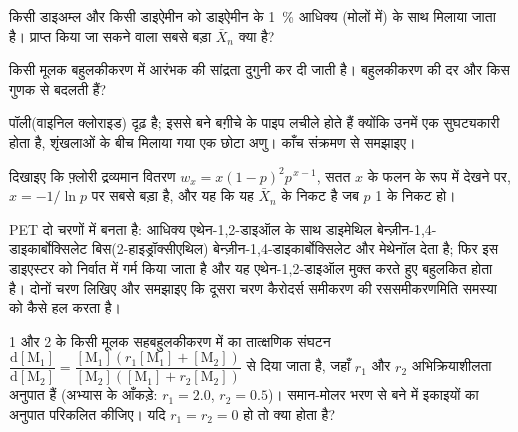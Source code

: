 \begin{exercise}[$\star\star$]\label{exo:b2:polymer-synthesis:7}
किसी डाइअम्ल और किसी डाइऐमीन को डाइऐमीन के 1~\% आधिक्य (मोलों में) के साथ मिलाया जाता है। प्राप्त किया जा सकने वाला
सबसे बड़ा $\bar X_n$ क्या है?
\end{exercise}

\begin{exercise}[$\star\star$]\label{exo:b2:polymer-synthesis:8}
किसी मूलक बहुलकीकरण में आरंभक की सांद्रता दुगुनी कर दी जाती है। बहुलकीकरण की दर और
 किस गुणक से बदलती हैं?
\end{exercise}

\begin{exercise}[$\star\star$]\label{exo:b2:polymer-synthesis:9}
पॉली(वाइनिल क्लोराइड) दृढ़ है; इससे बने बग़ीचे के पाइप लचीले होते हैं क्योंकि उनमें एक सुघट्यकारी होता है,
शृंखलाओं के बीच मिलाया गया एक छोटा अणु। काँच संक्रमण से समझाइए।
\end{exercise}

\begin{exercise}[$\star\star\star$]\label{exo:b2:polymer-synthesis:10}
दिखाइए कि फ़्लोरी द्रव्यमान वितरण $w_x = x(1-p)^2p^{\,x-1}$, सतत $x$ के फलन के रूप में देखने पर,
$x = -1/\ln p$ पर सबसे बड़ा है, और यह कि यह $\bar X_n$ के निकट है जब $p$ 1 के निकट हो।
\end{exercise}

\begin{exercise}[$\star\star\star$]\label{exo:b2:polymer-synthesis:11}
PET दो चरणों में बनता है: आधिक्य एथेन-1,2-डाइऑल के साथ डाइमेथिल बेन्ज़ीन-1,4-डाइकार्बोक्सिलेट
बिस(2-हाइड्रॉक्सीएथिल) बेन्ज़ीन-1,4-डाइकार्बोक्सिलेट और मेथेनॉल देता है; फिर इस डाइएस्टर को निर्वात में गर्म किया जाता है
और यह एथेन-1,2-डाइऑल मुक्त करते हुए बहुलकित होता है। दोनों चरण लिखिए और समझाइए कि दूसरा चरण
कैरोदर्स समीकरण की रससमीकरणमिति समस्या को कैसे हल करता है।
\end{exercise}

\begin{exercise}[$\star\star\star$]\label{exo:b2:polymer-synthesis:12}
 1 और 2 के किसी मूलक सहबहुलकीकरण में  का तात्क्षणिक संघटन
$\dfrac{\mathrm d[\mathrm M_1]}{\mathrm d[\mathrm M_2]} = \dfrac{[\mathrm M_1](r_1[\mathrm M_1]
+ [\mathrm M_2])}{[\mathrm M_2]([\mathrm M_1] + r_2[\mathrm M_2])}$ से दिया जाता है, जहाँ $r_1$ और $r_2$
अभिक्रियाशीलता अनुपात हैं (अभ्यास के आँकड़े: $r_1 = 2.0$, $r_2 = 0.5$)। समान-मोलर भरण से बने  में
इकाइयों का अनुपात परिकलित कीजिए। यदि $r_1 = r_2 = 0$ हो तो क्या होता है?
\end{exercise}

